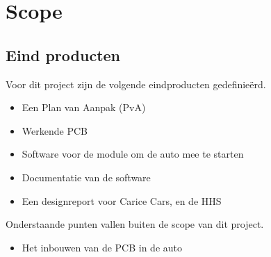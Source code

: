 \section{Scope}

\subsection{Eind producten}
Voor dit project zijn de volgende eindproducten gedefinieërd.
\begin{itemize}
	\item Een Plan van Aanpak (PvA)
	\item Werkende PCB
	\item Software voor de module om de auto mee te starten
	\item Documentatie van de software
	\item Een designreport voor Carice Cars, en de HHS
\end{itemize}

Onderstaande punten vallen buiten de scope van dit project.

\begin{itemize}
	\item Het inbouwen van de PCB in de auto
\end{itemize}
